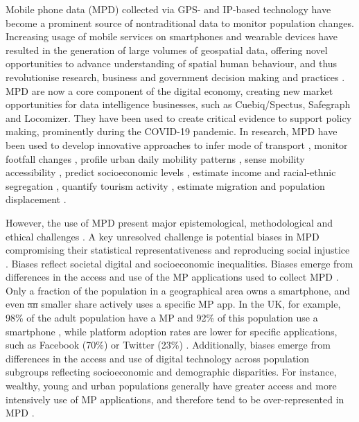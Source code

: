 \documentclass[]{rsos}%
\providecommand{\DIFadd}[1]{{\protect\color{blue}\uwave{#1}}} %
\providecommand{\DIFdel}[1]{{\protect\color{red}\sout{#1}}}                      %
\providecommand{\DIFaddbegin}{} %
\providecommand{\DIFaddend}{} %
\providecommand{\DIFdelbegin}{} %
\providecommand{\DIFdelend}{} %
\begin{document}
Mobile phone data (MPD) collected via GPS- and IP-based technology have
become a prominent source of nontraditional data to monitor population
changes. Increasing usage of mobile services on smartphones and wearable
devices have resulted in the generation of large volumes of geospatial
data, offering novel opportunities to advance understanding of spatial
human behaviour, and thus revolutionise research, business and
government decision making and practices \citep{rowe23-bigdata}. MPD are now
a core component of the digital economy, creating new market
opportunities for data intelligence businesses, such as Cuebiq/Spectus,
Safegraph and Locomizer. They have been used to create critical evidence
to support policy making, prominently during the COVID-19 pandemic. In
research, MPD have been used to develop innovative approaches to infer
mode of transport \citep{graells-garrido2023}, monitor footfall changes
\citep{ballantyne2022, hunter2021}, profile urban daily mobility patterns
\citep{cabrera-arnau2023, mavrogeni25, kakimoto25}, sense mobility
accessibility \citep{graells-garrido2021}, predict socioeconomic levels
\citep{soto2011, blumenstock2015}, estimate income \citep{moro2021} and
racial-ethnic segregation \citep{Xu2024}, quantify tourism activity
\citep{raun2016}, estimate migration \citep{cepal24, gonzález-leonardo2025} and
population displacement \citep{rowe2022, iradukunda2025, cabrera25}.

However, the use of MPD present major epistemological, methodological
and ethical challenges \citep{rowe23-bigdata}. A key unresolved challenge is
potential biases in MPD compromising their statistical
representativeness and reproducing social injustice
\citep{wesolowski13-biases}. Biases reflect societal digital and
socioeconomic inequalities. Biases emerge from differences in the access
and use of the MP applications used to collect MPD \citep{porter2012, wesolowski13-biases}. Only a fraction of the population in a
geographical area owns a smartphone, and even \DIFdelbegin \DIFdel{an }\DIFdelend \DIFaddbegin \DIFadd{a }\DIFaddend smaller share actively
uses a specific MP app. In the UK, for example, 98\% of the adult
population have a MP and 92\% of this population use a smartphone
\citep{ofcom23}, while platform adoption rates are lower for specific
applications, such as Facebook (70\%) or Twitter (23\%) \citep{statista24}.
Additionally, biases emerge from differences in the access and use of
digital technology across population subgroups reflecting socioeconomic
and demographic disparities. For instance, wealthy, young and urban
populations generally have greater access and more intensively use of MP
applications, and therefore tend to be over-represented in MPD
\citep{blumenstock2010, wesolowski13-biases, schlosser21-biases}.
\end{document}
